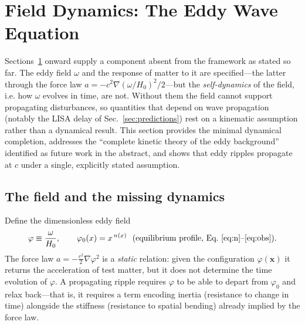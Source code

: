 
\section{Field Dynamics: The Eddy Wave Equation}
\label{sec:dynamics}

Sections~\ref{sec:dynamics} onward supply a component absent from the framework
as stated so far. The eddy field $\omega$ and the response of matter to it are
specified---the latter through the force law
$a = -c^2\nabla(\omega/H_0)^2/2$---but the \emph{self-dynamics} of the field, i.e.
how $\omega$ evolves in time, are not. Without them the field cannot support
propagating disturbances, so quantities that depend on wave propagation (notably
the LISA delay of Sec.~\ref{sec:predictions}) rest on a kinematic assumption rather
than a dynamical result. This section provides the minimal dynamical completion,
addresses the ``complete kinetic theory of the eddy background'' identified as
future work in the abstract, and shows that eddy ripples propagate at $c$ under a
single, explicitly stated assumption.

\subsection{The field and the missing dynamics}

Define the dimensionless eddy field
\begin{equation}
\varphi \equiv \frac{\omega}{H_0}, \qquad
\varphi_0(x) = x^{\,n(x)} \ \ \text{(equilibrium profile, Eq.~\ref{eq:n}--\ref{eq:obs})}.
\end{equation}
The force law $a = -\tfrac{c^2}{2}\nabla\varphi^2$ is a \emph{static} relation: given
the configuration $\varphi(\mathbf{x})$ it returns the acceleration of test matter,
but it does not determine the time evolution of $\varphi$. A propagating ripple
requires $\varphi$ to be able to depart from $\varphi_0$ and relax back---that is, it
requires a term encoding inertia (resistance to change in time) alongside the
stiffness (resistance to spatial bending) already implied by the force law.

